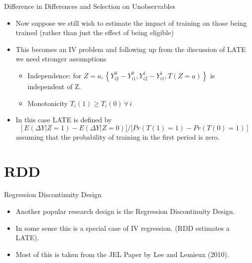 \documentclass[xcolor=pdftex,dvipsnames,table,mathserif]{beamer}
\begin{document}
\begin{frame}{Difference in Differences and Selection on Unobservables}
\begin{itemize}
\item Now suppose we still wish to estimate the impact of training on those being trained (rather than just the effect of being eligible)
\item This becomes an IV problem and following up from the discussion of LATE we need stronger assumptions
\begin{itemize}
\item  Independence: for $Z = a, \left\{Y_{i2}^0 - Y_{i1}^0, Y_{i2}^1 - Y_{i1}^1, T(Z=a)\right\}$ is independent of Z.
\item Monotonicity $T_i(1) \ge T_i(0) \, \forall \, i$
\end{itemize}
\item In this case LATE is defined by
 $$\left [E(\Delta Y | Z = 1) - E(\Delta Y | Z = 0)] / [Pr(T(1) = 1) - Pr(T(0) = 1) \right]$$
assuming that the probability of training in the first period is zero.
\end{itemize}              
\end{frame}

\section*{RDD}
\begin{frame}{Regression Discontinuity Design}
\begin{itemize}
\item Another popular research design is the \alert{Regression Discontinuity Design}.
\item In some sense this is a special case of IV regression. (RDD estimates a LATE).
\item Most of this is taken from the JEL Paper by Lee and Lemieux (2010).
\end{itemize}              
\end{frame}
\end{document}
